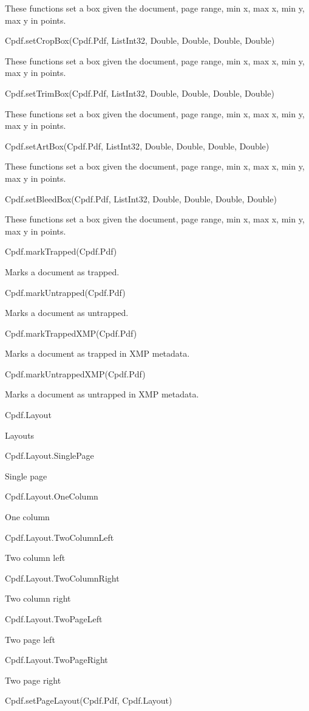 These functions set a box given the document, page range, min x, max x, 
min y, max y in points.

Cpdf.setCropBox(Cpdf.Pdf, List{Int32}, Double, Double, Double, Double)

These functions set a box given the document, page range, min x, max x, 
min y, max y in points.

Cpdf.setTrimBox(Cpdf.Pdf, List{Int32}, Double, Double, Double, Double)

These functions set a box given the document, page range, min x, max x, 
min y, max y in points.

Cpdf.setArtBox(Cpdf.Pdf, List{Int32}, Double, Double, Double, Double)

These functions set a box given the document, page range, min x, max x, 
min y, max y in points.

Cpdf.setBleedBox(Cpdf.Pdf, List{Int32}, Double, Double, Double, Double)

These functions set a box given the document, page range, min x, max x, 
min y, max y in points.

Cpdf.markTrapped(Cpdf.Pdf)

Marks a document as trapped.

Cpdf.markUntrapped(Cpdf.Pdf)

Marks a document as untrapped.

Cpdf.markTrappedXMP(Cpdf.Pdf)

Marks a document as trapped in XMP metadata.

Cpdf.markUntrappedXMP(Cpdf.Pdf)

Marks a document as untrapped in XMP metadata.

Cpdf.Layout

Layouts

Cpdf.Layout.SinglePage

Single page

Cpdf.Layout.OneColumn

One column

Cpdf.Layout.TwoColumnLeft

Two column left

Cpdf.Layout.TwoColumnRight

Two column right

Cpdf.Layout.TwoPageLeft

Two page left

Cpdf.Layout.TwoPageRight

Two page right

Cpdf.setPageLayout(Cpdf.Pdf, Cpdf.Layout)

